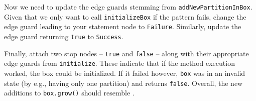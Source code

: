 \begin{stepbystep}
\begin{figure}[htbp]
   \centering
      \caption{}
\end{figure}
\FloatBarrier

\clearpage

\item Now we need to update the edge guards stemming from \texttt{add\-New\-Part\-ition\-In\-Box}. Given that we only want to call
\texttt{initializeBox} if the pattern fails, change the edge guard leading to your statement node to \texttt{Failure}. Similarly, update the edge guard
returning \texttt{true} to \texttt{Success}.

\item Finally, attach two stop nodes -- \texttt{true} and \texttt{false} -- along with their appropriate edge guards from
\texttt{initialize}. These indicate that if the method execution worked, the box could be initialized. If it failed however, \texttt{box} was
in an invalid state (by e.g., having only one partition) and returns \texttt{false}. Overall, the new additions to \texttt{box.grow()} should resemble
.


\end{stepbystep}
